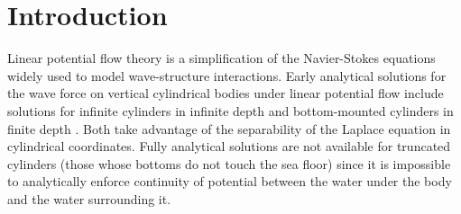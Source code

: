 \documentclass[ASNA,twocolumn]{USG} %
\begin{document}
\section{Introduction}
\label{jfm:sec:Introduction}
Linear potential flow theory is a simplification of the Navier-Stokes equations widely used to model wave-structure interactions.
Early analytical solutions for the wave force on vertical cylindrical bodies under linear potential flow include solutions for infinite cylinders in infinite depth \citep{havelock_forces_1936} and bottom-mounted cylinders in finite depth \citep{fuchs_wave_1954}.
Both take advantage of the separability of the Laplace equation in cylindrical coordinates.
Fully analytical solutions are not available for truncated cylinders (those whose bottoms do not touch the sea floor) since it is impossible to analytically enforce continuity of potential between the water under the body and the water surrounding it.
\end{document}
